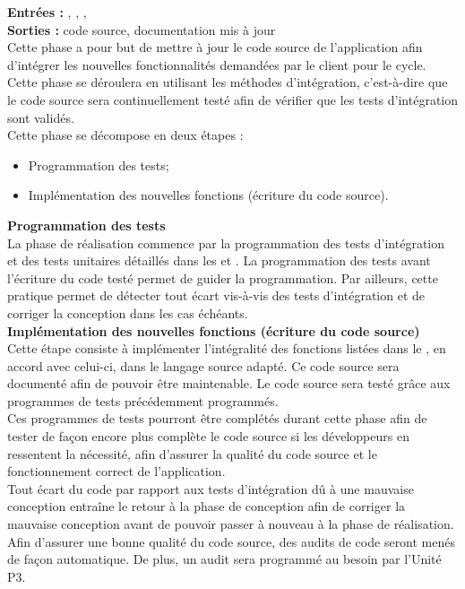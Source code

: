 \textbf{Entrées :} \DCPCourt , \DCDCourt , \PTUCourt , \PTICourt \\
\textbf{Sorties :} code source, documentation mis à jour \\
Cette phase a pour but de mettre à jour le code source de l’application afin d’intégrer les nouvelles fonctionnalités demandées par le client pour le cycle. Cette phase se déroulera en utilisant les méthodes d’intégration, c’est-à-dire que le code source sera continuellement testé afin de vérifier que les tests d’intégration sont validés.\\ 
Cette phase se décompose en deux étapes :
\begin{itemize}
\item Programmation des tests;
\item Implémentation des nouvelles fonctions (écriture du code source).\\
\end{itemize}

\textbf{Programmation des tests} \\
La phase de réalisation commence par la programmation des tests d’intégration et des tests unitaires détaillés dans les \PTICourt{} et \PTUCourt . 
La programmation des tests avant l’écriture du code testé permet de guider la programmation. 
Par ailleurs, cette pratique permet de détecter tout écart vis-à-vis des tests d’intégration et de corriger la conception dans les cas échéants.\\

\textbf{Implémentation des nouvelles fonctions (écriture du code source)} \\
Cette étape consiste à implémenter l’intégralité des fonctions listées dans le \DCCourt, en accord avec celui-ci, dans le langage source adapté. Ce code source sera documenté afin de pouvoir être maintenable.
Le code source sera testé grâce aux programmes de tests précédemment programmés.\\
Ces programmes de tests pourront être complétés durant cette phase afin de tester de façon encore plus complète le code source si les développeurs en ressentent la nécessité, afin d’assurer la qualité du code source et le fonctionnement correct de l’application. \\
Tout écart du code par rapport aux tests d’intégration dû à une mauvaise conception entraîne le retour à la phase de conception afin de corriger la mauvaise conception avant de pouvoir passer à nouveau à la phase de réalisation.
Afin d’assurer une bonne qualité du code source, des audits de code seront menés de façon automatique. De plus, un audit sera programmé au besoin par l’Unité P3.


